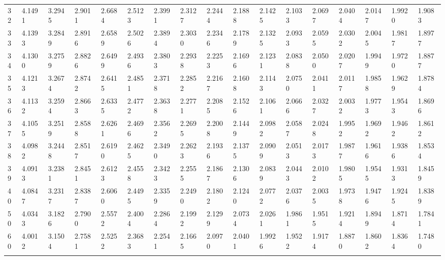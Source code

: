 {\begin{tabular}{|m{8pt}|m{18pt}*{15}{m{18pt}}}
 32 & 4.1491 & 3.2945 & 2.9011 & 2.6684 & 2.5123 & 2.3991 & 2.3127 & 2.2444 & 2.1888 & 2.1425 & 2.1033 & 2.0697 & 2.0404 & 2.0147 & 1.9920 & 1.9083 \\[2pt] \arrayrulecolor{light-gray}\hline\arrayrulecolor{black}  
 33 & 4.1393 & 3.2849 & 2.8916 & 2.6589 & 2.5026 & 2.3894 & 2.3030 & 2.2346 & 2.1789 & 2.1325 & 2.0933 & 2.0595 & 2.0302 & 2.0045 & 1.9817 & 1.8977 \\[2pt] \arrayrulecolor{light-gray}\hline\arrayrulecolor{black}  
 34 & 4.1300 & 3.2759 & 2.8826 & 2.6499 & 2.4936 & 2.3803 & 2.2938 & 2.2253 & 2.1696 & 2.1231 & 2.0838 & 2.0500 & 2.0207 & 1.9949 & 1.9720 & 1.8877 \\[2pt] \arrayrulecolor{light-gray}\hline\arrayrulecolor{black}  
 35 & 4.1213 & 3.2674 & 2.8742 & 2.6415 & 2.4851 & 2.3718 & 2.2852 & 2.2167 & 2.1608 & 2.1143 & 2.0750 & 2.0411 & 2.0117 & 1.9858 & 1.9629 & 1.8784 \\[2pt] \arrayrulecolor{light-gray}\hline\arrayrulecolor{black}  
 36 & 4.1132 & 3.2594 & 2.8663 & 2.6335 & 2.4772 & 2.3638 & 2.2771 & 2.2085 & 2.1526 & 2.1061 & 2.0666 & 2.0327 & 2.0032 & 1.9773 & 1.9543 & 1.8696 \\[2pt] \arrayrulecolor{light-gray}\hline\arrayrulecolor{black}  
 37 & 4.1055 & 3.2519 & 2.8588 & 2.6261 & 2.4696 & 2.3562 & 2.2695 & 2.2008 & 2.1449 & 2.0982 & 2.0587 & 2.0248 & 1.9952 & 1.9692 & 1.9462 & 1.8612 \\[2pt] \arrayrulecolor{light-gray}\hline\arrayrulecolor{black}  
 38 & 4.0982 & 3.2448 & 2.8517 & 2.6190 & 2.4625 & 2.3490 & 2.2623 & 2.1936 & 2.1375 & 2.0909 & 2.0513 & 2.0173 & 1.9877 & 1.9616 & 1.9386 & 1.8534 \\[2pt] \arrayrulecolor{light-gray}\hline\arrayrulecolor{black}  
 39 & 4.0913 & 3.2381 & 2.8451 & 2.6123 & 2.4558 & 2.3423 & 2.2555 & 2.1867 & 2.1306 & 2.0839 & 2.0443 & 2.0102 & 1.9805 & 1.9545 & 1.9313 & 1.8459 \\[2pt] \arrayrulecolor{light-gray}\hline\arrayrulecolor{black}  
 40 & 4.0847 & 3.2317 & 2.8387 & 2.6060 & 2.4495 & 2.3359 & 2.2490 & 2.1802 & 2.1240 & 2.0772 & 2.0376 & 2.0035 & 1.9738 & 1.9476 & 1.9245 & 1.8389 \\[2pt] \arrayrulecolor{light-gray}\hline\arrayrulecolor{black}  
 50 & 4.0343 & 3.1826 & 2.7900 & 2.5572 & 2.4004 & 2.2864 & 2.1992 & 2.1299 & 2.0734 & 2.0261 & 1.9861 & 1.9515 & 1.9214 & 1.8949 & 1.8714 & 1.7841 \\[2pt] \arrayrulecolor{light-gray}\hline\arrayrulecolor{black}  
 60 & 4.0012 & 3.1504 & 2.7581 & 2.5252 & 2.3683 & 2.2541 & 2.1665 & 2.0970 & 2.0401 & 1.9926 & 1.9522 & 1.9174 & 1.8870 & 1.8602 & 1.8364 & 1.7480 \\[2pt] \arrayrulecolor{light-gray}\hline\arrayrulecolor{black}  

\end{tabular}}
